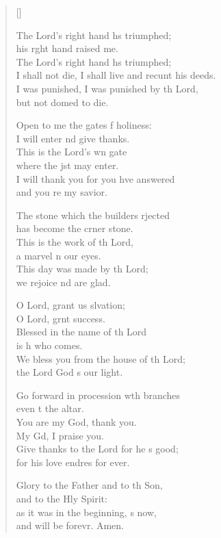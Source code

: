 \begin{verse}[\versewidth]
\begin{patverse}
    The Lord’s right hand hs triumphed;\Med\\
    his r\pointup{\i}ght hand raised me.\\
    The Lord’s right hand hs triumphed;\Med\\
    I shall not die, I shall live and recunt his deeds.\\
    I was punished, I was punished by th Lord,\Med\\
    but not domed to die.

    Open to me the gates f holiness:\Med\\
    I will enter nd give thanks.\\
    This is the Lord’s wn gate\Med\\
    where the jst may enter.\\
    I will thank you for you hve answered\Med\\
    and you re my savior.

    The stone which the builders rjected\Med\\
    has become the crner stone.\\
    This is the work of th Lord,\Med\\
    a marvel \pointup{\i}n our eyes.\\
    This day was made by th Lord;\Med\\
    we rejoice nd are glad.

    O Lord, grant us slvation;\Med\\
    O Lord, grnt success.\\
    Blessed in the name of th Lord\Med\\
    is h who comes.\\
    We bless you from the house of th Lord;\Med\\
    the Lord God \pointup{\i}s our light.

    Go forward in procession w\pointup{\i}th branches\Med\\
    even t the altar.\\
    You are my God,  thank you.\Med\\
    My Gd, I praise you.\\
    Give thanks to the Lord for he \pointup{\i}s good;\Med\\
    for his love endres for ever.

    Glory to the Father and to th Son,\Med\\
    and to the Hly Spirit:\\
    as it was in the beginning, \pointup{\i}s now,\Med\\
    and will be forevr. Amen.
  \end{patverse}
\end{verse}

